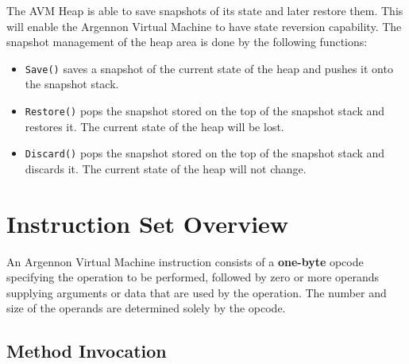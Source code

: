 The AVM Heap is able to save snapshots of its state and later restore them. This will enable the Argennon
Virtual Machine to have state reversion capability. The snapshot management of the heap area is done by
the following functions:
\begin{itemize}
    \item \texttt{Save()} saves a snapshot of the current state of the heap and pushes it onto the
    snapshot stack.
    \item \texttt{Restore()} pops the snapshot stored on the top of the snapshot stack and restores it. The
    current state of the heap will be lost.
    \item \texttt{Discard()} pops the snapshot stored on the top of the snapshot stack and discards it. The current
    state of the heap will not change.
\end{itemize}


\section{Instruction Set Overview}\label{sec:instruction-set-overview}

An Argennon Virtual Machine instruction consists of a \textbf{one-byte} opcode specifying the operation to be
performed, followed by zero or more operands supplying arguments or data that are used by the operation.
The number and size of the operands are determined solely by the opcode.

\subsection{Method Invocation}\label{subsec:method-invocation}

